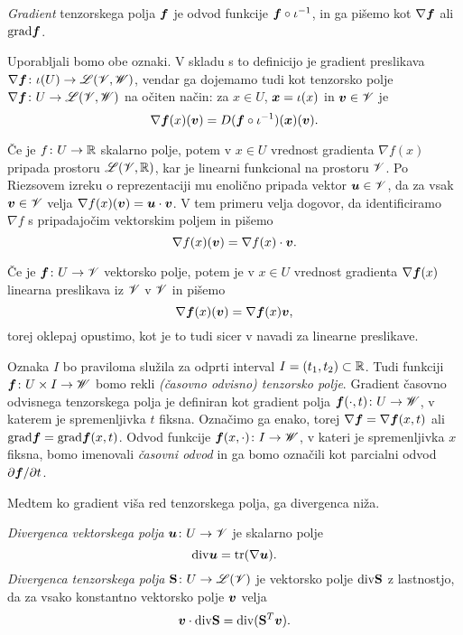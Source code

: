 \begin{definicija}
	\emph{Gradient} tenzorskega polja $\boldsymbol f$ je odvod funkcije $\boldsymbol f\circ\iota^{-1}$,
	in ga pišemo kot $\nabla\boldsymbol f$ ali $\mathrm{grad}\boldsymbol f$.
\end{definicija}
Uporabljali bomo obe oznaki. V skladu s to definicijo je gradient preslikava
$\nabla\boldsymbol f\colon\iota(U)\to\mathscr L(\mathscr V,\mathscr W)$, vendar ga dojemamo tudi kot tenzorsko polje
$\nabla\boldsymbol f\colon U\to\mathscr L(\mathscr V,\mathscr W)$ na očiten način: za $x\in U$,
$\boldsymbol x=\iota(x)$ in $\boldsymbol v\in\mathscr V$ je
\[
	\nabla\boldsymbol f(x)(\boldsymbol v)=D(\boldsymbol f\circ\iota^{-1})(\boldsymbol x)(\boldsymbol v).
\]

Če je $f\colon U\to\mathbb R$ skalarno polje, potem v $x\in U$ vrednost gradienta $\nabla f(x)$
pripada prostoru $\mathscr L(\mathscr V,\mathbb R)$, kar je linearni funkcional na prostoru $\mathscr V$. Po Riezsovem
izreku o reprezentaciji mu enolično pripada vektor $\boldsymbol u\in\mathscr V$, da za vsak
$\boldsymbol v\in\mathscr V$ velja $\nabla f(x)(\boldsymbol v)=\boldsymbol u\cdot\boldsymbol v$. V tem primeru velja
dogovor, da identificiramo $\nabla f$ s pripadajočim vektorskim poljem in pišemo
\[ \nabla f(x)(\boldsymbol v)=\nabla f(x)\cdot\boldsymbol v. \]

Če je $\boldsymbol f\colon U\to\mathscr V$ vektorsko polje, potem je v $x\in U$ vrednost gradienta $\nabla\boldsymbol f(x)$
linearna preslikava iz $\mathscr V$ v $\mathscr V$ in pišemo
\[ \nabla\boldsymbol f(x)(\boldsymbol v)=\nabla\boldsymbol f(x)\boldsymbol v, \]
torej oklepaj opustimo, kot je to tudi sicer v navadi za linearne preslikave.

Oznaka $I$ bo praviloma služila za odprti interval $I=(t_1,t_2)\subset\mathbb R$. Tudi funkciji
$\boldsymbol f\colon U\times I\to\mathscr W$ bomo rekli \emph{(časovno odvisno) tenzorsko polje}.
Gradient časovno odvisnega tenzorskega polja je definiran kot gradient polja
$\boldsymbol f(\cdot,t)\colon U\to\mathscr W$, v katerem je spremenljivka $t$ fiksna. Označimo
ga enako, torej $\nabla\boldsymbol f=\nabla\boldsymbol f(x,t)$ ali $\mathrm{grad}\boldsymbol f=\mathrm{grad}\boldsymbol f(x,t)$.
Odvod funkcije $\boldsymbol f(x,\cdot)\colon I\to\mathscr W$, v kateri je spremenljivka $x$ fiksna,
bomo imenovali \emph{časovni odvod} in ga bomo označili kot parcialni odvod
$\partial\boldsymbol f/\partial t$.

Medtem ko gradient viša red tenzorskega polja, ga divergenca niža.
\begin{definicija} \label{def:div}
	\emph{Divergenca vektorskega polja} $\boldsymbol u\colon U\to\mathscr V$ je skalarno polje
	\begin{equation} \label{e:div1}
		\mathrm{div}\boldsymbol u=\mathrm{tr}(\nabla\boldsymbol u).
	\end{equation}
	\emph{Divergenca tenzorskega polja} $\mathbf S\colon U\to\mathscr L(\mathscr V)$ je vektorsko polje $\mathrm{div}\mathbf S$ z lastnostjo,
	da za vsako konstantno vektorsko polje $\boldsymbol v$ velja
	\begin{equation} \label{e:div2}
		\boldsymbol v\cdot\mathrm{div}\mathbf S = \mathrm{div}(\mathbf S^{T}\boldsymbol v).
	\end{equation}
\end{definicija}

